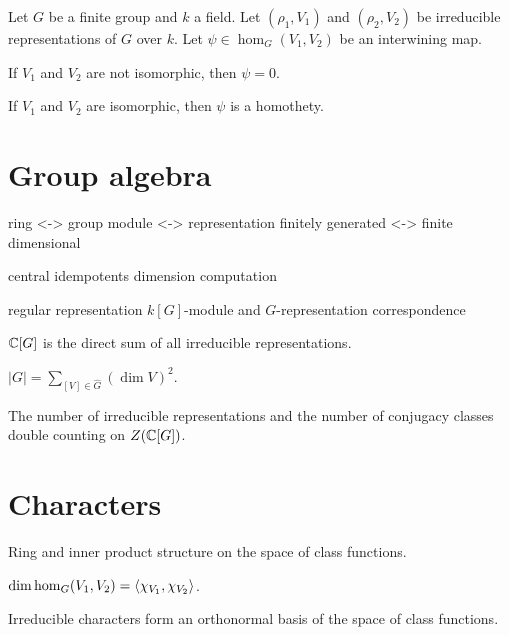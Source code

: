 \documentclass{../note}
\begin{document}
\begin{prb}
Let $G$ be a finite group and $k$ a field.
Let $(\rho_1,V_1)$ and $(\rho_2,V_2)$ be irreducible representations of $G$ over $k$.
Let $\psi\in\hom_G(V_1,V_2)$ be an interwining map.
\begin{parts}
\item If $V_1$ and $V_2$ are not isomorphic, then $\psi=0$.
\item If $V_1$ and $V_2$ are isomorphic, then $\psi$ is a homothety.
\end{parts}
\end{prb}




\section{Group algebra}


\begin{prb}
ring <-> group
module <-> representation
finitely generated <-> finite dimensional
\end{prb}

\begin{prb}
central idempotents
dimension computation
\end{prb}

\begin{prb}
regular representation
$k[G]$-module and $G$-representation correspondence
\begin{parts}
\item $\mathbb{C}[G]$ is the direct sum of all irreducible representations.
\item $|G|=\sum_{[V]\in\hat G}(\dim V)^2$.
\end{parts}
\end{prb}

\begin{prb}
The number of irreducible representations and the number of conjugacy classes
double counting on $Z(\mathbb{C}[G])$.
\end{prb}



\section{Characters}




\begin{prb}
Ring and inner product structure on the space of class functions.
\begin{parts}
\item $\dim\hom_G(V_1,V_2)=\langle\chi_{V_1},\chi_{V_2}\rangle$.
\item Irreducible characters form an orthonormal basis of the space of class functions.
\end{parts}
\end{prb}
\end{document}
